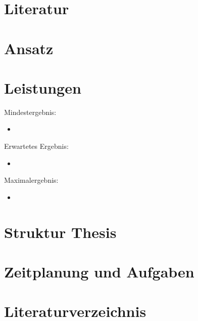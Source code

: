 \documentclass[12pt]{article}
\begin{document}
 
\section{Literatur}

\section{Ansatz}


\section{Leistungen}
Mindestergebnis:
\begin{itemize}  
\item 
\end{itemize}
Erwartetes Ergebnis:
\begin{itemize}  
\item 
\end{itemize}
Maximalergebnis:
\begin{itemize}  
\item 
\end{itemize}

\newpage{}


\begin{appendix}
\section{Struktur Thesis}

\section{Zeitplanung und Aufgaben}

\end{appendix}
  
\newpage{}
\section{Literaturverzeichnis}

\newpage{}
\end{document}
